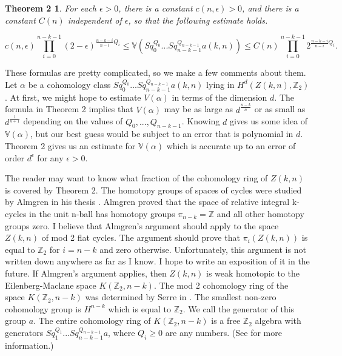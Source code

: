 \documentclass{amsart}
\newtheorem*{Theorem 1}{Theorem 1}
\newtheorem*{Theorem 2}{Theorem 2}
\newtheorem*{Theorem 1A}{Theorem 1A}
\newtheorem*{Theorem 2A}{Theorem 2A}
\newtheorem*{vanishing lemma}{Vanishing Lemma}
\numberwithin{equation}{section}
\begin{document}
\begin{Theorem 2} For each $\epsilon > 0$, there is a constant
$c(n, \epsilon) > 0$, and there is a constant $C(n)$ independent
of $\epsilon$, so that the following estimate holds.

$$c(n, \epsilon) \prod_{i=0}^{n-k-1} (2 -
\epsilon)^{\frac{n-k-i}{n-i} Q_i} \le \mathbb{V}(Sq_0^{Q_0} ...
Sq_{n-k-1}^{Q_{n-k-1}} a(k,n)) \le C(n) \prod_{i=0}^{n-k-1}
2^{\frac{n-k-i}{n-i} Q_i}.$$

\end{Theorem 2}

These formulas are pretty complicated, so we make a few comments
about them.  Let $\alpha$ be a cohomology class 
$Sq_0^{Q_0} ... Sq_{n-k-1}^{Q_{n-k-1}} a(k,n)$ lying in $H^d(Z(k,n), \mathbb{Z}_2)$.
At first, we might hope to estimate $V(\alpha)$ in terms of the dimension
$d$.  The formula in Theorem 2 implies that $V(\alpha)$ may be as large
as $d^{\frac{n-k}{n}}$ or as small as $d^{\frac{1}{k+1}}$ depending on
the values of $Q_0, ..., Q_{n-k-1}$.  Knowing $d$ gives us some idea
of $\mathbb{V}(\alpha)$, but our best guess would be subject to an error that
is polynomial in $d$.  Theorem 2 gives us an estimate for $\mathbb{V}(\alpha)$
which is accurate up to an error
of order $d^{\epsilon}$ for any $\epsilon > 0$.

The reader may want to know what fraction of the cohomology ring of $Z(k,n)$
is covered by Theorem 2.  The homotopy groups of spaces of cycles were studied
by Almgren in his thesis \cite{A}.  Almgren proved that the space
of relative integral k-cycles in the unit n-ball has homotopy
groups $\pi_{n-k} = \mathbb{Z}$ and all other homotopy groups
zero.  I believe that Almgren's argument should apply to the
space $Z(k,n)$ of mod 2 flat cycles.  The argument should prove
that $\pi_i(Z(k,n))$ is equal to $\mathbb{Z}_2$ for $i = n-k$ and
zero otherwise.  Unfortunately, this argument is not written down
anywhere as far as I know.  I hope to write an exposition of it in the
future.  If Almgren's argument applies, then $Z(k,n)$ is weak
homotopic to the Eilenberg-Maclane space $K(\mathbb{Z}_2, n-k)$.  
The mod 2 cohomology ring of the space $K(\mathbb{Z}_2, n-k)$ was
determined by Serre in \cite{S}.  The smallest non-zero cohomology
group is $H^{n-k}$ which is equal to $\mathbb{Z}_2$.  We call
the generator of this group $a$.  The entire cohomology ring
of $K(\mathbb{Z}_2, n-k)$ is a free $\mathbb{Z}_2$ algebra
with generators $Sq_1^{Q_1} ... Sq_{n-k-1}^{Q_{n-k-1}} a$, where
$Q_i \ge 0$ are any numbers.  (See \cite{H} for more information.)
\end{document}
